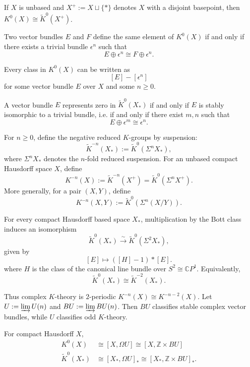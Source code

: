 \documentclass[12pt]{article}
\begin{document}
If \(X\) is unbased and \(X^+ := X \sqcup \{*\}\) denotes \(X\) with a disjoint basepoint, then $K^0(X) \cong \widetilde K^0(X^+)$.

\begin{proposition}
Two vector bundles \(E\) and \(F\) define the same element of \(K^0(X)\) if and only if there exists a trivial bundle \(\epsilon^n\) such that
\[
E\oplus \epsilon^n \cong F\oplus \epsilon^n.
\]
\end{proposition}

\begin{proposition}
Every class in \(K^0(X)\) can be written as
\[
[E]-[\epsilon^n]
\]
for some vector bundle \(E\) over \(X\) and some \(n\geq 0\).
\end{proposition}

\begin{proposition}
A vector bundle \(E\) represents zero in \(\widetilde K^0(X_*)\) if and only if \(E\) is stably isomorphic to a trivial bundle, i.e. if and only if there exist \(m,n\) such that
\[
E\oplus \epsilon^m \cong \epsilon^n.
\]
\end{proposition}

\begin{definition}
For \(n\geq 0\), define the negative reduced \(K\)-groups by suspension:
\[
\widetilde K^{-n}(X_*) := \widetilde K^0(\Sigma^n X_*),
\]
where \(\Sigma^n X_*\) denotes the \(n\)-fold reduced suspension. For an unbased compact Hausdorff space \(X\), define
\[
K^{-n}(X) := \widetilde K^{-n}(X^+)
= \widetilde K^0(\Sigma^n X^+).
\]
More generally, for a pair \((X,Y)\), define
\[
K^{-n}(X,Y) := \widetilde K^0(\Sigma^n(X/Y)).
\]
\end{definition}
\begin{theorem}
For every compact Hausdorff based space \(X_*\), multiplication by the Bott class induces an isomorphism
\[
\widetilde K^0(X_*) \xrightarrow{\sim}
\widetilde K^0(\Sigma^2 X_*),
\]
given by
\[
[E] \longmapsto ([H]-1)*[E].
\] where \(H\) is the class of the canonical line bundle over \(S^2\cong \mathbb CP^1\).
Equivalently,
\[
\widetilde K^0(X_*) \cong \widetilde K^{-2}(X_*).
\]
\end{theorem}

Thus complex \(K\)-theory is \(2\)-periodic $K^{-n}(X) \cong K^{-n-2}(X)$. Let $U := \varinjlim U(n)$ and $BU := \varinjlim BU(n)$.
Then \(BU\) classifies stable complex vector bundles, while \(U\) classifies odd \(K\)-theory.

\begin{theorem}
For compact Hausdorff \(X\),
\begin{align*}
    K^0(X) &\cong [X,\Omega U] \cong [X,\mathbb Z\times BU] \\
    \widetilde K^0(X_*) &\cong [X_*,\Omega U]_* \cong [X_*,\mathbb Z\times BU]_*.
\end{align*}
\end{theorem}
\end{document}
